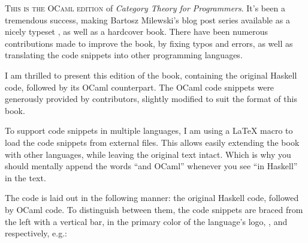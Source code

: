 
\lettrine[lhang=0.17]{T}{his is the OCaml edition} of \emph{Category Theory for Programmers}.
It's been a tremendous success, making Bartosz Milewski's blog post series available as a nicely 
typeset , as well as a hardcover book. There have been numerous contributions made
to improve the book, by fixing typos and errors, as well as translating the code snippets into
other programming languages.

I am thrilled to present this edition of the book, containing the original Haskell code, followed by
its OCaml counterpart. The OCaml code snippets were generously provided by
 contributors, slightly 
modified to suit the format of this book.

To support code snippets in multiple languages, I am using a \LaTeX{} macro to load the code snippets
from external files. This allows easily extending the book with other languages, while leaving the 
original text intact. Which is why you should mentally append the words ``and OCaml'' whenever you see
``in Haskell'' in the text.

The code is laid out in the following manner: the original Haskell code, followed by OCaml code.
To distinguish between them, the code snippets are braced from the left with a vertical bar, in the primary
color of the language's logo, , 
and  respectively, e.g.:

\unskip
{}
\NoIndentAfterThis